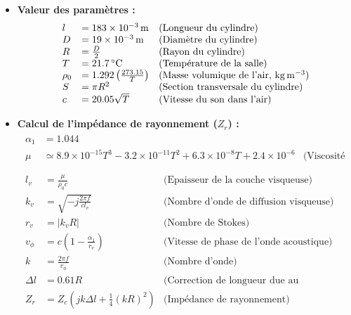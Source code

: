 \documentclass[atiam, article]{rapport} %
\begin{document}
\begin{itemize}
    \item \textbf{Valeur des paramètres :}
    \begin{align*}
        \begin{array}{lll}
            l & = \SI{183e-3}{\meter} & \text{(Longueur du cylindre)} \\
            D & = \SI{19e-3}{\meter} & \text{(Diamètre du cylindre)} \\
            R & = \frac{D}{2} & \text{(Rayon du cylindre)} \\
            T & = \SI{21.7}{\celsius} & \text{(Température de la salle)}\\
            \rho_0 & = 1.292 \left(\frac{273.15}{T}\right) & \text{(Masse volumique de l'air, \si{\kg.\m^{-3}})} \\
            S & = \pi R^2 & \text{(Section transversale du cylindre)} \\
            c & = 20.05 \sqrt{T} & \text{(Vitesse du son dans l'air)}
        \end{array}
    \end{align*}

    \item \textbf{Calcul de l'impédance de rayonnement (\(Z_r\)) :}
    \begin{align*}
        \begin{array}{lll}
            \alpha_1 & = 1.044 \\
            \mu & \simeq 8.9 \times 10^{-15} T^3 - 3.2 \times 10^{-11} T^2 + 6.3 \times 10^{-8} T + 2.4 \times 10^{-6} & \text{(Viscosité de l'air)}\\
        \end{array}
    \end{align*}
    \begin{align*}
        \begin{array}{lll}
            l_v & = \frac{\mu}{\rho_0 c} & \text{(Epaisseur de la couche visqueuse)} \\
            k_v & = \sqrt{-j \frac{2\pi f}{c l_v}} & \text{(Nombre d'onde de diffusion visqueuse)} \\
            r_v & = \lvert k_v R \rvert & \text{(Nombre de Stokes)} \\
            v_\phi & = c \left(1 - \frac{\alpha_1}{r_v}\right) & \text{(Vitesse de phase de l'onde acoustique)} \\
            k & = \frac{2\pi f}{v_\phi} & \text{(Nombre d'onde)} \\
            \Delta l & = 0.61 R & \text{(Correction de longueur due au rayonnement)} \\
            Z_r & = Z_c \left(jk\Delta l + \frac{1}{4}(kR)^2\right) & \text{(Impédance de rayonnement)}
        \end{array}
    \end{align*}


\end{itemize}
\end{document}
